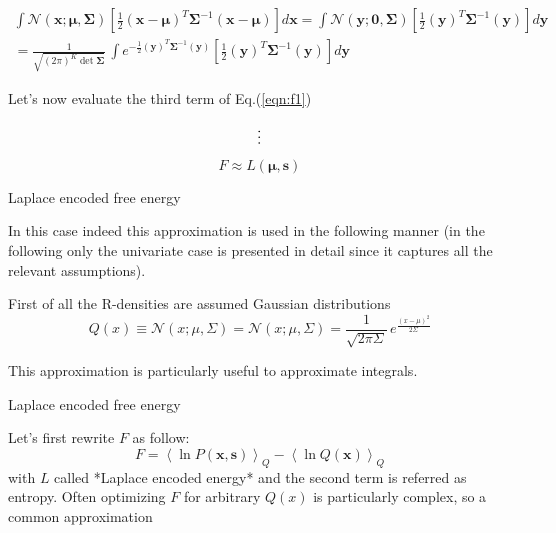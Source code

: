 \documentclass[a4paper, 10pt]{article}
\begin{document}
\begin{equation}
\begin{split}
\int \mathcal{N}(\mathbf x; \bm \mu, \bm \Sigma) \left[ \frac{1}{2} (\mathbf x-\boldsymbol \mu)^T \boldsymbol \Sigma^{-1} (\mathbf x-\boldsymbol \mu) \right] d \mathbf x = 
\int \mathcal{N}(\mathbf y; \bm 0, \bm \Sigma) \left[ \frac{1}{2} (\mathbf y)^T \boldsymbol \Sigma^{-1} (\mathbf y) \right] d \mathbf y \\
= \frac{1}{\sqrt{( 2 \pi)^{K} \det \boldsymbol \Sigma}} \, \int e^{ - \frac{1}{2} (\mathbf y)^T \boldsymbol \Sigma^{-1} (\mathbf y)} \left[ \frac{1}{2} (\mathbf y)^T \boldsymbol \Sigma^{-1} (\mathbf y) \right] d \mathbf y 
\end{split}
\end{equation}

Let's now evaluate the third term of Eq.(\ref{eqn:f1})


\begin{equation}
\vdots \notag
\end{equation}

\begin{equation}
F \approx L(\bm \mu,\mathbf s)
\end{equation}



\newpage
Laplace encoded free energy

In this case indeed this approximation is used in the following manner (in the following only the univariate case is presented in detail since it captures all the relevant assumptions).

First of all the R-densities are assumed Gaussian distributions
$$
Q(x) \equiv \mathcal{N}(x;\mu,\Sigma)= \mathcal{N}(x;\mu, \Sigma) = \frac{1}{\sqrt{ 2 \pi \Sigma}} \, e^{\frac{(x-\mu)^2}{2 \Sigma}}
$$







This approximation is particularly useful to approximate integrals. 




Laplace encoded free energy

Let's first rewrite $F$ as follow:
$$
F= \left< \ln P(\mathbf x,\mathbf s) \right>_{Q} - \left< \ln Q(\mathbf x) \right>_{Q}
$$
with $L$ called *Laplace encoded energy* and the second term is referred as entropy.
Often optimizing $F$ for arbitrary $Q(x)$ is particularly complex, so a common approximation 


\newpage

\printbibliography
\end{document}
